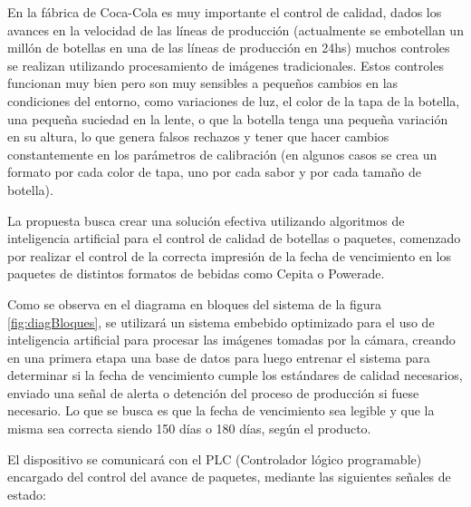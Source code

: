\documentclass[11pt]{charter}
\begin{document}
En la fábrica de Coca-Cola es muy importante el control de calidad, dados los avances en la velocidad de las líneas de producción (actualmente se embotellan un millón de botellas en una de las líneas de producción en 24hs) muchos controles se realizan utilizando procesamiento de imágenes tradicionales.	Estos controles funcionan muy bien pero son muy sensibles a pequeños cambios en las condiciones del entorno, como variaciones de luz, el color de la tapa de la botella, una pequeña suciedad en la lente, o que la botella tenga una pequeña variación en su altura, lo que genera falsos rechazos y tener que hacer cambios constantemente en los parámetros de calibración (en algunos casos se crea un formato por cada color de tapa, uno por cada sabor y por cada tamaño de botella). 

La propuesta busca crear una solución efectiva utilizando algoritmos de inteligencia artificial para el control de calidad de botellas o paquetes, comenzado por realizar el control de la correcta impresión de la fecha de vencimiento en los paquetes de distintos formatos de bebidas como Cepita o Powerade.

Como se observa en el diagrama en bloques del sistema de la figura \ref{fig:diagBloques}, se utilizará un sistema embebido optimizado para el uso de inteligencia artificial para procesar las imágenes tomadas por la cámara, creando en una primera etapa una base de datos para luego entrenar el sistema para determinar si la fecha de vencimiento cumple los estándares de calidad necesarios, enviado una señal de alerta o detención del proceso de producción si fuese necesario. Lo que se busca es que la fecha de vencimiento sea legible y que la misma sea correcta siendo 150 días o 180 días, según el producto.



El dispositivo se comunicará con el PLC (Controlador lógico programable) encargado del control del avance de paquetes, mediante las siguientes señales de estado:
\end{document}
